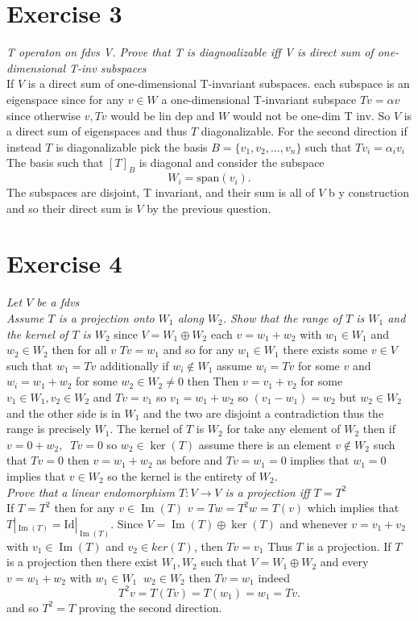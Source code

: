 \documentclass{article}
\DeclareMathOperator{\Ima}{Im}
\begin{document}
    \section{Exercise 3}
    \emph{T operaton on fdvs V. Prove that T is diagnoalizable iff V is direct sum of one-dimensional T-inv subspaces}\\
    If $V$ is a direct sum of one-dimensional T-invariant subspaces. each subspace is an eigenspace since for any $v \in W$ a
    one-dimensional T-invariant subspace
     $Tv = \alpha v$ since otherwise $v,Tv$ would be lin dep and $W$ would not be one-dim T inv.
     So $V$ is a direct sum of eigenspaces and thus $T$ diagonalizable. For the second direction
     if instead $T$ is diagonalizable pick the basis $B = \{v_1,v_2,...,v_n\}$  such that $Tv_i = \alpha_i v_i$
     The basis such that $[T]_B$ is diagonal and consider the subspace
     \[
     W_i = \text{span}(v_i)
     .\] 
     The subspaces are disjoint, T invariant, and their sum is all of $V$ b y construction and so their direct sum is $V$ by the
     previous question.


     \section{Exercise 4}
     \emph{
         Let $V$ be a fdvs\\
         Assume $T$ is a projection onto $W_1$ along $W_2$. Show that the range of $T$ is $W_1$ and
         the kernel of $T$ is $W_2$
     }
     since $V = W_1 \oplus W_2$ each $v = w_1 + w_2$ with $w_1 \in W_1$ and $w_2 \in W_2$ 
     then for all $v$ $Tv = w_1$ and so for any $w_1 \in W_1$ there exists some $v \in V$ such that $w_1 = Tv$ additionally
     if $w_i \not \in W_1$ assume  $w_i = Tv$ for some $v$ and $w_i = w_1 + w_2$ for some $w_2 \in W_2 \ne 0$ then
     Then $v = v_1 + v_2$ for some $v_1 \in W_1, v_2 \in W_2$ and $Tv = v_1$ so $v_1 = w_1 + w_2$ so $(v_1-w_1) = w_2$ but $w_2 \in W_2$ and the other
     side is in $W_1$ and the two are disjoint a contradiction thus the range is precisely $W_1$.
     The kernel of $T$ is $W_2$ for take any element of $W_2$ then if $v = 0 + w_2, \;\; Tv = 0$ so $w_2 \in \ker(T)$ assume there is an element $v \not\in W_2$ such that $Tv = 0$ 
     then $v = w_1 + w_2$ as before and $Tv = w_1 = 0$ implies that $w_1 =0$ implies that $v \in W_2$ so the kernel is the entirety of $W_2$.\\
     \emph{
         Prove that a linear endomorphism $T: V \rightarrow V$ is a projection iff $T = T^2$ 
     }\\
     If $T = T^2$ then for any $v \in \Ima(T)$ $v = Tw = T^2w = T(v)$ which implies that
     $T|_{\Ima(T)} = \text{Id}|_{\Ima(T)}$. Since $V = \Ima(T) \oplus \ker(T)$ 
     and whenever  $v = v_1 + v_2$ with $v_1 \in \Ima(T)$ and $v_2 \in ker(T)$, then $Tv = v_1$ Thus
     $T$ is a projection. If $T$ is a projection then there exist $W_1, W_2$ such that $V = W_1 \oplus W_2$ and  every $v = w_1 + w_2$ with $w_1 \in W_1 \;\; w_2 \in W_2$ then $Tv = w_1$
     indeed
     \[
     T^2v = T(Tv) = T(w_1) = w_1 = Tv
     .\] 
     and so $T^2 = T$ proving the second direction.
\end{document}
